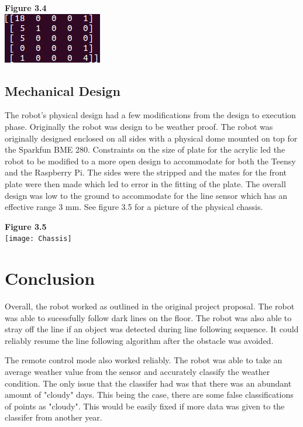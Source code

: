 \documentclass[UTF8]{article}
\begin{document}
\begin{center}
\textbf{Figure 3.4} \\
\includegraphics[scale=1]{ConfusionMatrix}
\end{center}

\subsection{Mechanical Design}
The robot's physical design had a few modifications from the design to execution phase. Originally the robot was design to be weather proof. The robot was originally designed enclosed on all sides with a physical dome mounted on top for the Sparkfun BME 280. Constraints on the size of plate for the acrylic led the robot to be modified to a more open design to accommodate for both the Teensy and the Raspberry Pi. The sides were the stripped and the mates for the front plate were then made which led to error in the fitting of the plate. The overall design was low to the ground to accommodate for the line sensor which has an effective range 3 mm. See figure 3.5 for a picture of the physical chassis. 
\vspace{6mm}
\begin{center}
\textbf{Figure 3.5} \\
\texttt{[image: Chassis]}
\end{center}

\section{Conclusion}
Overall, the robot worked as outlined in the original project proposal. The robot was able to sucessfully follow dark lines on the floor. The robot was also able to stray off the line if an object was detected during line following sequence. It could reliably resume the line following algorithm after the obstacle was avoided. 

\vspace{4mm}
\noindent
The remote control mode also worked reliably. The robot was able to take an average weather value from the sensor and accurately classify the weather condition. The only issue that the classifer had was that there was an abundant amount of "cloudy" days. This being the case, there are some false classifications of points as "cloudy". This would be easily fixed if more data was given to the classifer from another year. 
\end{document}
